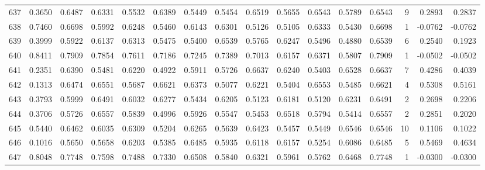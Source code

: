 \begin{tabular}{lrrrrrrrrrrrrrrr}
637 &      0.3650 &  0.6487 &  0.6331 &  0.5532 &  0.6389 &  0.5449 &  0.5454 &  0.6519 &  0.5655 &  0.6543 &   0.5789 &     0.6543 &      9 &                    0.2893 &                     0.2837 \\
638 &      0.7460 &  0.6698 &  0.5992 &  0.6248 &  0.5460 &  0.6143 &  0.6301 &  0.5126 &  0.5105 &  0.6333 &   0.5430 &     0.6698 &      1 &                   -0.0762 &                    -0.0762 \\
639 &      0.3999 &  0.5922 &  0.6137 &  0.6313 &  0.5475 &  0.5400 &  0.6539 &  0.5765 &  0.6247 &  0.5496 &   0.4880 &     0.6539 &      6 &                    0.2540 &                     0.1923 \\
640 &      0.8411 &  0.7909 &  0.7854 &  0.7611 &  0.7186 &  0.7245 &  0.7389 &  0.7013 &  0.6157 &  0.6371 &   0.5807 &     0.7909 &      1 &                   -0.0502 &                    -0.0502 \\
641 &      0.2351 &  0.6390 &  0.5481 &  0.6220 &  0.4922 &  0.5911 &  0.5726 &  0.6637 &  0.6240 &  0.5403 &   0.6528 &     0.6637 &      7 &                    0.4286 &                     0.4039 \\
642 &      0.1313 &  0.6474 &  0.6551 &  0.5687 &  0.6621 &  0.6373 &  0.5077 &  0.6221 &  0.5404 &  0.6553 &   0.5485 &     0.6621 &      4 &                    0.5308 &                     0.5161 \\
643 &      0.3793 &  0.5999 &  0.6491 &  0.6032 &  0.6277 &  0.5434 &  0.6205 &  0.5123 &  0.6181 &  0.5120 &   0.6231 &     0.6491 &      2 &                    0.2698 &                     0.2206 \\
644 &      0.3706 &  0.5726 &  0.6557 &  0.5839 &  0.4996 &  0.5926 &  0.5547 &  0.5453 &  0.6518 &  0.5794 &   0.5414 &     0.6557 &      2 &                    0.2851 &                     0.2020 \\
645 &      0.5440 &  0.6462 &  0.6035 &  0.6309 &  0.5204 &  0.6265 &  0.5639 &  0.6423 &  0.5457 &  0.5449 &   0.6546 &     0.6546 &     10 &                    0.1106 &                     0.1022 \\
646 &      0.1016 &  0.5650 &  0.5658 &  0.6203 &  0.5385 &  0.6485 &  0.5935 &  0.6118 &  0.6157 &  0.5254 &   0.6086 &     0.6485 &      5 &                    0.5469 &                     0.4634 \\
647 &      0.8048 &  0.7748 &  0.7598 &  0.7488 &  0.7330 &  0.6508 &  0.5840 &  0.6321 &  0.5961 &  0.5762 &   0.6468 &     0.7748 &      1 &                   -0.0300 &                    -0.0300 \\

\end{tabular}
